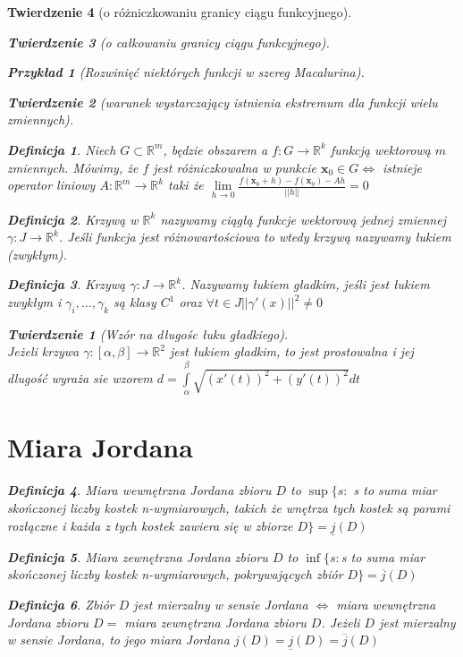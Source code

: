 \documentclass[12pt,a4paper]{article}
\newtheorem{tw}{Twierdzenie}
\newtheorem{przyklad}{Przykład}
\theoremstyle{definition}
\newtheorem{df}{Definicja}
\begin{document}
\begin{tw}[o różniczkowaniu granicy ciągu funkcyjnego]
\begin{tw}[o całkowaniu granicy ciągu funkcyjnego]
\begin{przyklad}[Rozwinięć niektórych funkcji w szereg Macalurina]
\begin{tw}[warunek wystarczający istnienia ekstremum dla funkcji wielu zmiennych]
\begin{df}
Niech $G\subset\mathbb{R}^m$, będzie obszarem a $f: G\to\mathbb{R}^k$ funkcją wektorową $m$ zmiennych. Mówimy, że $f$ jest różniczkowalna w punkcie $\mathbf{x}_0\in G \Leftrightarrow$ istnieje operator liniowy $A: \mathbb{R}^m \to \mathbb{R}^k$ taki że $\lim\limits_{h\to 0}\frac{f(\mathbf{x}_0+h)-f(\mathbf{x}_0)-Ah}{||h||} = 0$
\end{df}

\begin{df}
Krzywą w $\mathbb{R}^k$ nazywamy ciągłą funkcje wektorową jednej zmiennej $\gamma: J\to\mathbb{R}^k$. Jeśli funkcja jest różnowartościowa to wtedy krzywą nazywamy łukiem (zwykłym).
\end{df}
\begin{df}
Krzywą $\gamma: J\to\mathbb{R}^k$. Nazywamy łukiem gładkim, jeśli jest łukiem zwykłym i $\gamma_i, \dots ,\gamma_k$ są klasy $C^1$ oraz $\forall t\in J ||\gamma '(x)||^2 \neq 0$
\end{df}

\begin{tw}[Wzór na długośc łuku gładkiego]~\\
Jeżeli krzywa $\gamma :[\alpha , \beta ] \to\mathbb{R}^2$ jest łukiem gładkim, to jest prostowalna i jej dlugość wyraża sie wzorem $d = \int\limits_\alpha^\beta \sqrt{(x'(t))^2 + (y'(t))^2}dt$
\end{tw}

\section{Miara Jordana}
\begin{df}
Miara wewnętrzna Jordana zbioru $D$ to $\sup\{s:$ s to suma miar skończonej liczby kostek n-wymiarowych, takich że wnętrza tych kostek są parami rozłączne i każda z tych kostek zawiera się w zbiorze $D\} = \underline{j}(D)$
\end{df}
\begin{df}
Miara zewnętrzna Jordana zbioru $D$ to $\inf\{s: $s to suma miar skończonej liczby kostek n-wymiarowych, pokrywających zbiór $ D\} = \overline{j}(D)$
\end{df}

\begin{df}
Zbiór $D$ jest mierzalny w sensie Jordana $\Leftrightarrow$ miara wewnętrzna Jordana zbioru $D = $ miara zewnętrzna Jordana zbioru $D$. 
Jeżeli $D$ jest mierzalny w sensie Jordana, to jego miara Jordana $j(D) = \underline{j}(D) = \overline{j}(D)$
\end{df}


\end{tw}
\end{przyklad}
\end{tw}
\end{tw}
\end{document}
